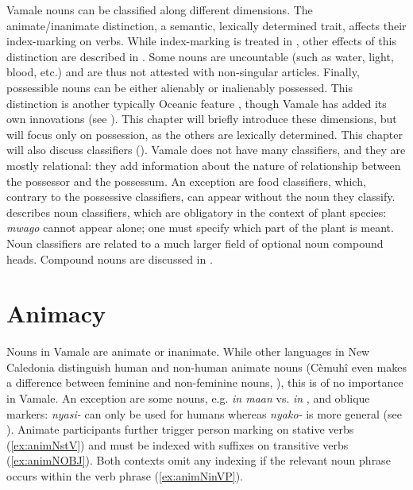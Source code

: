 \begin{sloppypar}
Vamale nouns can be classified along different dimensions. The animate\slash inanimate distinction, a semantic, lexically determined trait, affects their index\hyp marking on verbs. While index\hyp marking is treated in , other effects of this distinction are described in . Some nouns are uncountable (such as water, light, blood, etc.) and are thus not attested with non-singular articles. %
Finally, possessible nouns can be either alienably or inalienably possessed. This distinction is another typically Oceanic feature \parencite[41]{lynch_oceanic_2002}, though Vamale has added its own innovations (see ). This chapter will briefly introduce these dimensions, but will focus only on possession, as the others are lexically determined. 
This chapter will also discuss classifiers (). Vamale does not have many classifiers, and they are mostly relational: they add information about the nature of relationship between the possessor and the possessum. An exception are food classifiers, which, contrary to the possessive classifiers, can appear without the noun they classify.  describes noun classifiers, which are obligatory in the context of plant species: \textit{mwago}  cannot appear alone; one must specify which part of the plant is meant. Noun classifiers are related to a much larger field of optional noun compound heads. Compound nouns are discussed in .
\end{sloppypar}

\section{Animacy}
\label{sec:animN}

Nouns in Vamale are animate or inanimate. While other languages in New Caledonia distinguish human and non-human animate nouns (Cèmuhî even makes a difference between feminine and non-feminine nouns, \citealt[175]{rivierre_langue_1980}), this is of no importance in Vamale. An exception are some nouns, e.g. \textit{in maan}  vs. \textit{in} , and oblique markers:  \textit{nyasi-}  can only be used for humans whereas \textit{nyako-} is more general (see ). %
Animate participants further trigger person marking on stative verbs (\ref{ex:animNstV}) and must be indexed with suffixes on transitive verbs (\ref{ex:animNOBJ}). Both contexts omit any indexing if the relevant noun phrase occurs within the verb phrase (\ref{ex:animNinVP}). 


